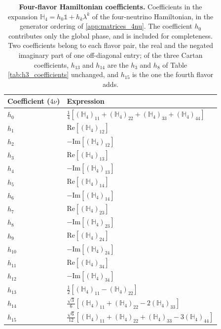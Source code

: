 \documentclass[final,5p,times,twocolumn,sort,compress]{elsarticle}
\begin{document}
{\def\arraystretch{1.2}
\begin{table}[t!]
 \begin{tabular}{ll}
  Coefficient ($4\nu$) & Expression \\
  \hline
  $h_0$    & $\frac{1}{4}\left[\left(\mathbb{H}_4\right)_{11}+\left(\mathbb{H}_4\right)_{22}+\left(\mathbb{H}_4\right)_{33}+\left(\mathbb{H}_4\right)_{44}\right]$ \\
  $h_1$    & $\text{Re}\left[\left(\mathbb{H}_4\right)_{12}\right]$ \\
  $h_2$    & $-\text{Im}\left[\left(\mathbb{H}_4\right)_{12}\right]$ \\
  $h_3$    & $\text{Re}\left[\left(\mathbb{H}_4\right)_{13}\right]$ \\
  $h_4$    & $-\text{Im}\left[\left(\mathbb{H}_4\right)_{13}\right]$ \\
  $h_5$    & $\text{Re}\left[\left(\mathbb{H}_4\right)_{14}\right]$ \\
  $h_6$    & $-\text{Im}\left[\left(\mathbb{H}_4\right)_{14}\right]$ \\
  $h_7$    & $\text{Re}\left[\left(\mathbb{H}_4\right)_{23}\right]$ \\
  $h_8$    & $-\text{Im}\left[\left(\mathbb{H}_4\right)_{23}\right]$ \\
  $h_9$    & $\text{Re}\left[\left(\mathbb{H}_4\right)_{24}\right]$ \\
  $h_{10}$ & $-\text{Im}\left[\left(\mathbb{H}_4\right)_{24}\right]$ \\
  $h_{11}$ & $\text{Re}\left[\left(\mathbb{H}_4\right)_{34}\right]$ \\
  $h_{12}$ & $-\text{Im}\left[\left(\mathbb{H}_4\right)_{34}\right]$ \\
  $h_{13}$ & $\frac{1}{2}\left[\left(\mathbb{H}_4\right)_{11}-\left(\mathbb{H}_4\right)_{22}\right]$ \\
  $h_{14}$ & $\frac{\sqrt{3}}{6}\left[\left(\mathbb{H}_4\right)_{11}+\left(\mathbb{H}_4\right)_{22}-2\left(\mathbb{H}_4\right)_{33}\right]$ \\
  $h_{15}$ & $\frac{\sqrt{6}}{12}\left[\left(\mathbb{H}_4\right)_{11}+\left(\mathbb{H}_4\right)_{22}+\left(\mathbb{H}_4\right)_{33}-3\left(\mathbb{H}_4\right)_{44}\right]$
 \end{tabular}
 \caption{\label{tab:h4_coefficients}{\bf Four-flavor Hamiltonian coefficients.} Coefficients in the expansion $\mathbb{H}_4 = h_0 \mathbb{1} + h_k \lambda^k$ of the four-neutrino Hamiltonian, in the generator ordering of \ref{app:matrices_4nu}.  The coefficient $h_0$ contributes only the global phase, and is included for completeness.  Two coefficients belong to each flavor pair, the real and the negated imaginary part of one off-diagonal entry; of the three Cartan coefficients, $h_{13}$ and $h_{14}$ are the $h_3$ and $h_8$ of Table \ref{tab:h3_coefficients} unchanged, and $h_{15}$ is the one the fourth flavor adds.}
\end{table}
}
\end{document}
